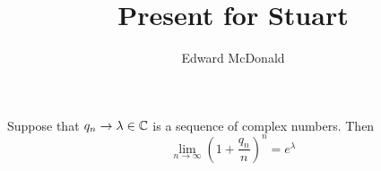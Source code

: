 \documentclass{unswmaths}
\begin{document}
\subject{Measure Theory}
\author{Edward McDonald}
\title{Present for Stuart}


\setlength\parindent{0pt}


\newcommand{\Bor}{\mathcal{B}}
\newcommand{\sdiff}{\bigtriangleup}
\newcommand{\Expect}{{\rm I\kern-.3em E}}
\newcommand{\Prob}{{\rm I\kern-.3em P}}
\newcommand{\Log}{\operatorname{Log}}


\unswtitle{}




\begin{lemma}
\label{stuart}
    Suppose that $q_n \rightarrow \lambda \in \mathbb{C}$ is a sequence of complex
    numbers. Then
    \begin{equation*}
        \lim_{n\rightarrow\infty} \left(1+\frac{q_n}{n}\right)^n = e^{\lambda}
    \end{equation*} 
\end{lemma}
\end{document}
